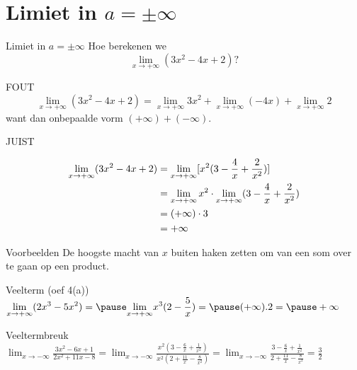 \documentclass[handout]{beamer}
\begin{document}
\section{Limiet in $a = \pm \infty$}
\begin{frame}{Limiet in $a = \pm \infty$}
Hoe berekenen we
$$\lim_{x \rightarrow + \infty} (3x^2 - 4x + 2) ?$$
\begin{block}{FOUT}
$$\lim_{x \rightarrow + \infty} (3x^2 - 4x + 2) = \lim_{x \rightarrow + \infty}
3x^2 + \lim_{x \rightarrow + \infty} (-4x) + \lim_{x \rightarrow +
\infty} 2$$
want dan  onbepaalde vorm $(+ \infty) + (-\infty)$.
\end{block}
\end{frame}
\begin{frame}
\begin{block}{JUIST}

\[\aligned
\lim_{x \rightarrow + \infty} (3x^2 - 4x + 2) & = \lim_{x
\rightarrow + \infty}
[x^2 (3 - \frac{4}{x} + \frac{2}{x^2})] \\
& = \lim_{x \rightarrow + \infty} x^2 \cdot \lim_{x \rightarrow +
\infty} (3 -
\frac{4}{x} + \frac {2}{x^2}) \\
& = (+ \infty) \cdot 3 \\
& = + \infty
\endaligned
\]
\end{block}

\end{frame}
\begin{frame}{Voorbeelden}
De hoogste macht van $x$ buiten haken zetten om van een som over te gaan op een product.
\begin{exampleblock}{Veelterm (oef 4(a))}
$\displaystyle{\lim_{x \rightarrow + \infty}} (2x^3 - 5x^2)= \pause \displaystyle{\lim_{x \rightarrow + \infty}} x^3 (2 - \frac{5}{x})= \pause (+ \infty) . 2 = \pause + \infty$
\end{exampleblock}
\pause
\begin{exampleblock}{Veeltermbreuk}
$\displaystyle{\lim_{x \rightarrow - \infty}} \frac{3x^2 - 6x
+ 1}{2x^2 + 11x - 8}
= \displaystyle{\lim_{x \rightarrow - \infty}} \frac{x^2 (3- \frac{6}{x}
+ \frac{1}{x^2})}{x^2 (2 + \frac{11}{x} - \frac{8}{x^2})}
= \displaystyle{\lim_{x \rightarrow - \infty}} \frac{3- \frac{6}{x}
+ \frac{1}{x^2}}{2 + \frac{11}{x} - \frac{8}{x^2}}
=\frac{3}{2}$

\end{exampleblock}
\end{frame}
\end{document}
